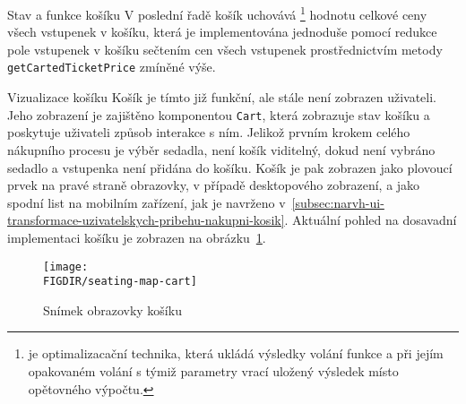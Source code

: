 \begin{subsection}{Stav a funkce košíku}
    V poslední řadě košík uchovává \footnote{ je optimalizacační technika, která ukládá výsledky volání funkce a při jejím opakovaném volání s týmiž parametry vrací uložený výsledek místo opětovného výpočtu.} hodnotu celkové ceny všech vstupenek v košíku, která je implementována jednoduše pomocí redukce pole vstupenek v košíku sečtením cen všech vstupenek prostřednictvím metody \texttt{getCartedTicketPrice} zmíněné výše.
\end{subsection}

\begin{subsection}{Vizualizace košíku}
    \label{subsec:implementace-kosik-vizualizace}
    Košík je tímto již funkční, ale stále není zobrazen uživateli.
    Jeho zobrazení je zajištěno komponentou \texttt{Cart}, která zobrazuje stav košíku a poskytuje uživateli způsob interakce s ním.
    Jelikož prvním krokem celého nákupního procesu je výběr sedadla, není košík viditelný, dokud není vybráno sedadlo a vstupenka není přidána do košíku.
    Košík je pak zobrazen jako plovoucí prvek na pravé straně obrazovky, v případě desktopového zobrazení, a jako spodní list na mobilním zařízení, jak je navrženo v~\ref{subsec:narvh-ui-transformace-uzivatelskych-pribehu-nakupni-kosik}.
    Aktuální pohled na dosavadní implementaci košíku je zobrazen na obrázku~\ref{fig:seating-map-cart}.

    \begin{figure}[h]
        \centering
        \texttt{[image: \\FIGDIR/seating-map-cart]}
        \caption{Snímek obrazovky košíku}
        \label{fig:seating-map-cart}
    \end{figure}
\end{subsection}

